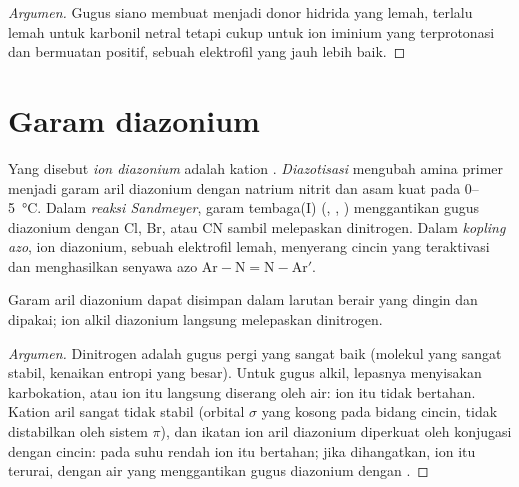 \begin{proof}[Argumen]
Gugus siano membuat  menjadi donor hidrida yang lemah, terlalu
lemah untuk karbonil netral tetapi cukup untuk ion iminium yang terprotonasi
dan bermuatan positif, sebuah elektrofil yang jauh lebih baik.
\end{proof}

\section{Garam diazonium}

\begin{definition}\label{def:b2:amines:diazonium}
Yang disebut \emph{ion diazonium} adalah kation . \emph{Diazotisasi}
mengubah amina  primer menjadi garam aril diazonium dengan natrium
nitrit dan asam kuat pada
0--\qty{5}{\degreeCelsius}. Dalam \emph{reaksi Sandmeyer},
garam tembaga(I) (, , ) menggantikan gugus
diazonium dengan Cl, Br, atau CN sambil melepaskan dinitrogen. Dalam
\emph{kopling azo}, ion diazonium, sebuah elektrofil
lemah, menyerang cincin  yang teraktivasi dan menghasilkan senyawa
azo $\mathrm{Ar{-}N{=}N{-}Ar'}$.
\end{definition}

\begin{proposition}\label{prop:b2:amines:diazonium}
Garam aril diazonium dapat disimpan dalam larutan berair yang dingin dan
dipakai; ion alkil diazonium langsung melepaskan dinitrogen.
\end{proposition}

\begin{proof}[Argumen]
Dinitrogen adalah gugus pergi yang sangat baik (molekul yang sangat stabil,
kenaikan entropi yang besar). Untuk gugus alkil, lepasnya 
menyisakan karbokation, atau ion itu langsung diserang oleh air: ion itu
tidak bertahan. Kation aril sangat tidak stabil (orbital $\sigma$ yang
kosong pada bidang cincin, tidak distabilkan oleh sistem $\pi$), dan ikatan
 ion aril diazonium diperkuat oleh konjugasi dengan cincin: pada
suhu rendah ion itu bertahan; jika dihangatkan, ion itu terurai, dengan air
yang menggantikan gugus diazonium dengan .
\end{proof}


